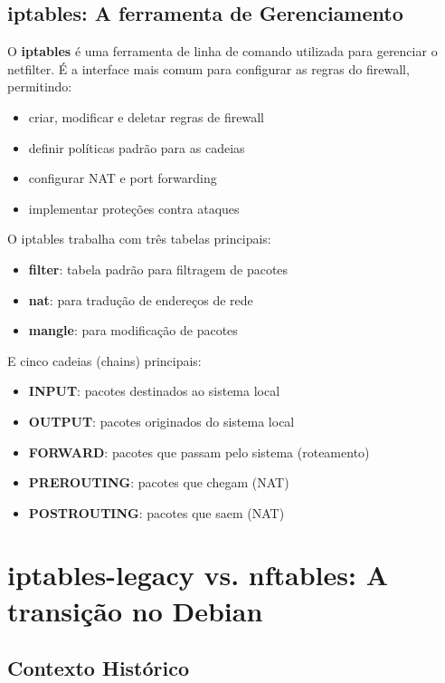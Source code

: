 ﻿\documentclass[12pt,fleqn]{article}
\begin{document}
\subsection{iptables: A ferramenta de Gerenciamento}

O \textbf{iptables} é uma ferramenta de linha de comando utilizada para gerenciar o netfilter. É a interface mais comum para configurar as regras do firewall, permitindo:

\begin{itemize}
    \item criar, modificar e deletar regras de firewall
    \item definir políticas padrão para as cadeias
    \item configurar NAT e port forwarding
    \item implementar proteções contra ataques
\end{itemize}

O iptables trabalha com três tabelas principais:
\begin{itemize}
    \item \textbf{filter}: tabela padrão para filtragem de pacotes
    \item \textbf{nat}: para tradução de endereços de rede
    \item \textbf{mangle}: para modificação de pacotes
\end{itemize}

E cinco cadeias (chains) principais:
\begin{itemize}
    \item \textbf{INPUT}: pacotes destinados ao sistema local
    \item \textbf{OUTPUT}: pacotes originados do sistema local
    \item \textbf{FORWARD}: pacotes que passam pelo sistema (roteamento)
    \item \textbf{PREROUTING}: pacotes que chegam (NAT)
    \item \textbf{POSTROUTING}: pacotes que saem (NAT)
\end{itemize}

\section{iptables-legacy vs. nftables: A transição no Debian}

\subsection{Contexto Histórico}
\end{document}
